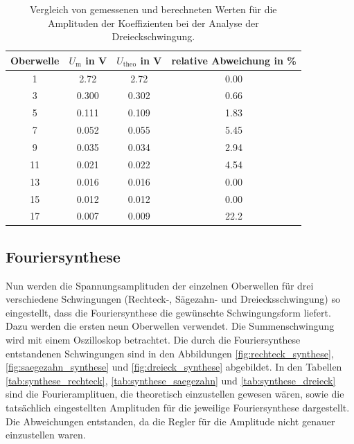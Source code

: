 \begin{table}
  \centering
  \begin{tabular}{c c c c}
    \toprule
    Oberwelle & $U_\text{m}$ in \si{\volt} & $U_\text{theo}$ in \si{\volt} &
    relative Abweichung in \% \\
    \midrule
    1  & 2.72  & 2.72  & 0.00 \\
    3  & 0.300 & 0.302 & 0.66 \\
    5  & 0.111 & 0.109 & 1.83 \\
    7  & 0.052 & 0.055 & 5.45 \\
    9  & 0.035 & 0.034 & 2.94 \\
    11 & 0.021 & 0.022 & 4.54 \\
    13 & 0.016 & 0.016 & 0.00 \\
    15 & 0.012 & 0.012 & 0.00 \\
    17 & 0.007 & 0.009 & 22.2 \\
    \bottomrule
  \end{tabular}
  \caption{Vergleich von gemessenen und berechneten Werten für die Amplituden
    der Koeffizienten bei der Analyse der Dreieckschwingung.}
  \label{tab:analyse_dreieck}
\end{table}


\subsection{Fouriersynthese}
Nun werden die Spannungsamplituden der einzelnen Oberwellen für drei verschiedene
Schwingungen (Rechteck-, Sägezahn- und Dreiecksschwingung) so eingestellt, dass
die Fouriersynthese die gewünschte Schwingungsform liefert. Dazu werden die ersten
neun Oberwellen verwendet.
Die Summenschwingung wird mit einem Oszilloskop betrachtet. Die durch die
Fouriersynthese entstandenen Schwingungen sind in den Abbildungen
\ref{fig:rechteck_synthese}, \ref{fig:saegezahn_synthese} und \ref{fig:dreieck_synthese}
abgebildet. In den Tabellen \ref{tab:synthese_rechteck}, \ref{tab:synthese_saegezahn}
und \ref{tab:synthese_dreieck} sind die Fourieramplituen, die theoretisch
einzustellen gewesen wären, sowie die tatsächlich eingestellten Amplituden für die
jeweilige Fouriersynthese dargestellt. Die Abweichungen entstanden, da die Regler
für die Amplitude nicht genauer einzustellen waren.



